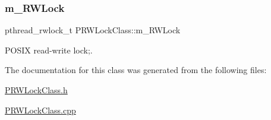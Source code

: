 \subsubsection{\texorpdfstring{m\+\_\+\+R\+W\+Lock}{m\_RWLock}}
{\footnotesize\ttfamily pthread\+\_\+rwlock\+\_\+t P\+R\+W\+Lock\+Class\+::m\+\_\+\+R\+W\+Lock\hspace{0.3cm}{\ttfamily [protected]}}



P\+O\+S\+IX read-\/write lock;. 



The documentation for this class was generated from the following files\+:\begin{DoxyCompactItemize}
\item 
\hyperlink{PRWLockClass_8h}{P\+R\+W\+Lock\+Class.\+h}\item 
\hyperlink{PRWLockClass_8cpp}{P\+R\+W\+Lock\+Class.\+cpp}\end{DoxyCompactItemize}
